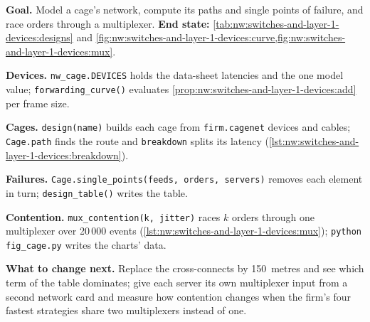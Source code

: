 \begin{tutorial}
\textbf{Goal.} Model a cage's network, compute its paths and single points of failure, and race orders through a multiplexer.
\textbf{End state:} \cref{tab:nw:switches-and-layer-1-devices:designs} and \cref{fig:nw:switches-and-layer-1-devices:curve,fig:nw:switches-and-layer-1-devices:mux}.
\begin{tutsteps}
\item \textbf{Devices.} \texttt{nw\_cage.DEVICES} holds the data-sheet latencies and the one model value;
  \texttt{forwarding\_curve()} evaluates \cref{prop:nw:switches-and-layer-1-devices:add} per frame size.
\item \textbf{Cages.} \texttt{design(name)} builds each cage from \texttt{firm.cagenet} devices and cables; \texttt{Cage.path} finds the
  route and \texttt{breakdown} splits its latency (\cref{lst:nw:switches-and-layer-1-devices:breakdown}).
\item \textbf{Failures.} \texttt{Cage.single\_points(feeds, orders, servers)} removes each element in turn;
  \texttt{design\_table()} writes the table.
\item \textbf{Contention.} \texttt{mux\_contention(k, jitter)} races $k$ orders through one multiplexer over 20\,000 events
  (\cref{lst:nw:switches-and-layer-1-devices:mux}); \texttt{python fig\_cage.py} writes the charts' data.
\end{tutsteps}
\textbf{What to change next.} Replace the cross-connects by 150~metres and see which term of the table dominates; give each server
its own multiplexer input from a second network card and measure how contention changes when the firm's four fastest strategies
share two multiplexers instead of one.
\end{tutorial}

\label{lst:nw:switches-and-layer-1-devices:breakdown}

\label{lst:nw:switches-and-layer-1-devices:mux}

